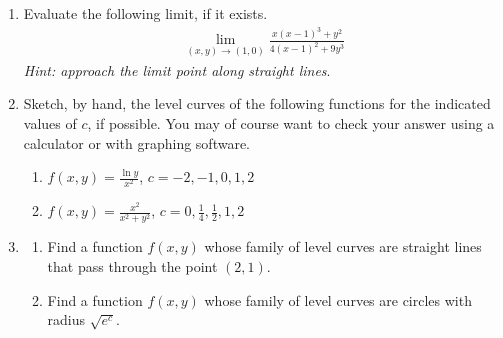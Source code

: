 \begin{enumerate}
\item 
Evaluate the following limit, if it exists.
\begin{align*} 
\lim_{(x,y)\rightarrow(1,0) } \frac{x(x-1)^3 + y^2}{4(x-1)^2+9y^3}
\end{align*}
 \textit{Hint: approach the limit point along straight lines}.
\item 
Sketch, by hand, the level curves of the following functions for the indicated values of $c$, if possible. You may of course want to check your answer using a calculator or with graphing software. 
\begin{enumerate}
\item $f(x,y) =\frac{\ln y}{x^2} $, $c=-2, - 1, 0 , 1 , 2$
\item $f(x,y) = \frac{x^2}{x^2+y^2}$, $c=0,\frac{1}{4},\frac{1}{2},1,2$
\end{enumerate}
\item 
\begin{enumerate}
\item Find a function $f(x,y)$ whose family of level curves are straight lines that pass through the point $(2,1)$.
\item Find a function $f(x,y)$ whose family of level curves are circles with radius $\sqrt{e^c}$. 
\end{enumerate}


\end{enumerate}

